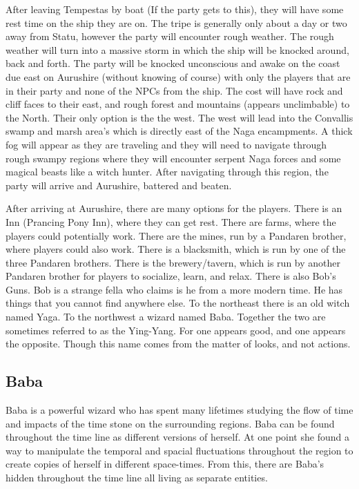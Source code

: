 After leaving Tempestas by boat (If the party gets to this), they will have some rest time on the ship they are on. The tripe is generally only about a day or two away from Statu, however the party will encounter rough weather. The rough weather will turn into a massive storm in which the ship will be knocked around, back and forth. The party will be knocked unconscious and awake on the coast due east on Aurushire (without knowing of course) with only the players that are in their party and none of the NPCs from the ship. The cost will have rock and cliff faces to their east, and rough forest and mountains (appears unclimbable) to the North. Their only option is the the west. The west will lead into the Convallis swamp and marsh area's which is directly east of the Naga encampments. A thick fog will appear as they are traveling and they will need to navigate through rough swampy regions where they will encounter serpent Naga forces and some magical beasts like a witch hunter. After navigating through this region, the party will arrive and Aurushire, battered and beaten.

After arriving at Aurushire, there are many options for the players. There is an Inn (Prancing Pony Inn), where they can get rest. There are farms, where the players could potentially work. There are the mines, run by a Pandaren brother, where players could also work. There is a blacksmith, which is run by one of the three Pandaren brothers. There is the brewery/tavern, which is run by another Pandaren brother for players to socialize, learn, and relax. There is also Bob's Guns. Bob is a strange fella who claims is he from a more modern time. He has things that you cannot find anywhere else. To the northeast there is an old witch named Yaga. To the northwest a wizard named Baba. Together the two are sometimes referred to as the Ying-Yang. For one appears good, and one appears the opposite. Though this name comes from the matter of looks, and not actions. 

\subsection{Baba}

Baba is a powerful wizard who has spent many lifetimes studying the flow of time and impacts of the time stone on the surrounding regions. Baba can be found throughout the time line as different versions of herself. At one point she found a way to manipulate the temporal and spacial fluctuations throughout the region to create copies of herself in different space-times. From this, there are Baba's hidden throughout the time line all living as separate entities. 

